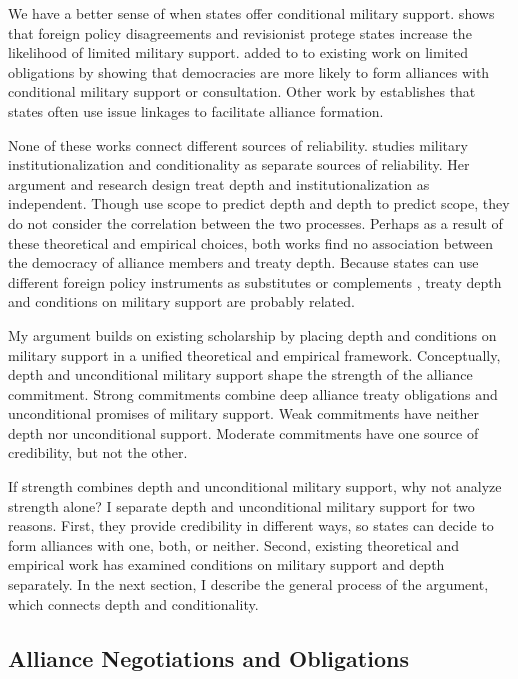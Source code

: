 \documentclass[12pt]{article}
\begin{document}
We have a better sense of when states offer conditional military support. 
\citet{Benson2012} shows that foreign policy disagreements and revisionist protege states increase the likelihood of limited military support.
\citep{Chibaetal2015} added to to existing work on limited obligations by showing that democracies are more likely to form alliances with conditional military support or consultation. 
Other work by \citet{Poast2012, Poast2013} establishes that states often use issue linkages to facilitate alliance formation. 


None of these works connect different sources of reliability.  
\citet{Mattes2012} studies military institutionalization and conditionality as separate sources of reliability. 
Her argument and research design treat depth and institutionalization as independent.
Though \citet{BensonClinton2016} use scope to predict depth and depth to predict scope, they do not consider the correlation between the two processes. 
Perhaps as a result of these theoretical and empirical choices, both works find no association between the democracy of alliance members and treaty depth. 
Because states can use different foreign policy instruments as substitutes or complements \citep{Starr2000, MorganPalmer2000}, treaty depth and conditions on military support are probably related. 


My argument builds on existing scholarship by placing depth and conditions on military support in a unified theoretical and empirical framework. 
Conceptually, depth and unconditional military support shape the strength of the alliance commitment. 
Strong commitments combine deep alliance treaty obligations and unconditional promises of military support. 
Weak commitments have neither depth nor unconditional support. 
Moderate commitments have one source of credibility, but not the other. 


If strength combines depth and unconditional military support, why not analyze strength alone? 
I separate depth and unconditional military support for two reasons. 
First, they provide credibility in different ways, so states can decide to form alliances with one, both, or neither.  
Second, existing theoretical and empirical work has examined conditions on military support and depth separately. 
In the next section, I describe the general process of the argument, which connects depth and conditionality. 


\subsection{Alliance Negotiations and Obligations}
\end{document}
